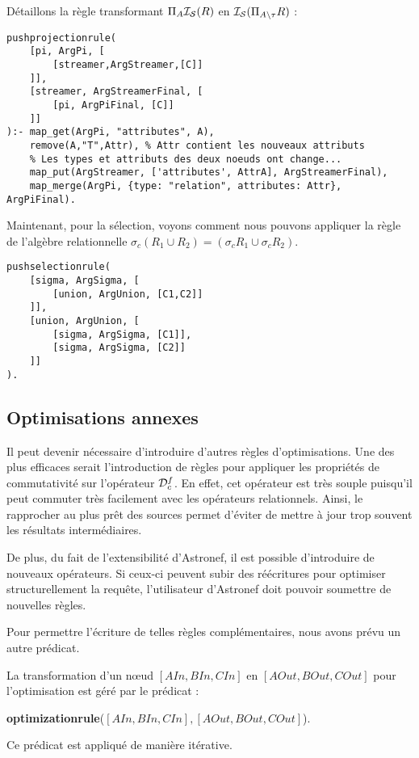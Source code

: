 \begin{example}
	Détaillons la règle transformant $\Pi_A \mathcal{I_S}(R)$ en $\mathcal{I_S}(\Pi_{A\backslash \tau} R)$ :
	\begin{lstlisting}
pushprojectionrule(
    [pi, ArgPi, [
        [streamer,ArgStreamer,[C]]
    ]],
    [streamer, ArgStreamerFinal, [
        [pi, ArgPiFinal, [C]]
    ]]
):- map_get(ArgPi, "attributes", A),
    remove(A,"T",Attr), % Attr contient les nouveaux attributs
	% Les types et attributs des deux noeuds ont change...
    map_put(ArgStreamer, ['attributes', AttrA], ArgStreamerFinal),
    map_merge(ArgPi, {type: "relation", attributes: Attr}, ArgPiFinal).
	\end{lstlisting}
	
	Maintenant, pour la sélection, voyons comment nous pouvons appliquer la règle de l'algèbre relationnelle $\sigma_c (R_1 \cup R_2) = (\sigma_c R_1 \cup \sigma_c R_2)$.
	\begin{lstlisting}
pushselectionrule(
    [sigma, ArgSigma, [
        [union, ArgUnion, [C1,C2]]
    ]],
    [union, ArgUnion, [
        [sigma, ArgSigma, [C1]], 
        [sigma, ArgSigma, [C2]]
    ]]
).
	\end{lstlisting}
\end{example}

\subsection{Optimisations annexes}
Il peut devenir nécessaire d'introduire d'autres règles d'optimisations. Une des plus efficaces serait l'introduction de règles pour appliquer les propriétés de commutativité sur l'opérateur $\mathcal{D}_c^f$. En effet, cet opérateur est très souple puisqu'il peut commuter très facilement avec les opérateurs relationnels. Ainsi, le rapprocher au plus prêt des sources permet d'éviter de mettre à jour trop souvent les résultats intermédiaires. 

De plus, du fait de l'extensibilité d'Astronef, il est possible d'introduire de nouveaux opérateurs. Si ceux-ci peuvent subir des réécritures pour optimiser structurellement la requête, l'utilisateur d'Astronef doit pouvoir soumettre de nouvelles règles.

Pour permettre l'écriture de telles règles complémentaires, nous avons prévu un autre prédicat.
\begin{regle}
La transformation d'un nœud $[AIn,BIn,CIn]$ en $[AOut,BOut,COut]$ pour l'optimisation est géré par le prédicat :
\begin{center} \textbf{optimizationrule}($[AIn,BIn,CIn],[AOut,BOut,COut]$).\end{center}
Ce prédicat est appliqué de manière itérative.
\end{regle}
